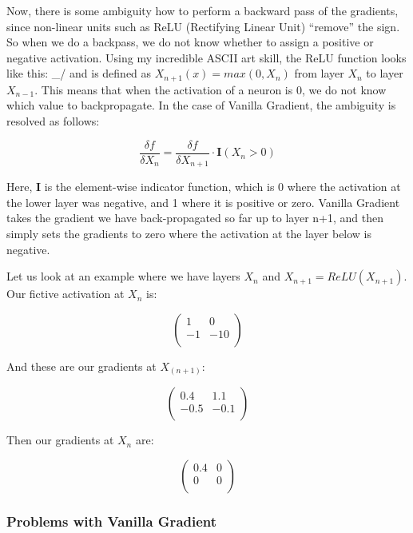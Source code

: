 \documentclass[
  12pt,
]{krantz}
\begin{document}
Now, there is some ambiguity how to perform a backward pass of the gradients, since non-linear units such as ReLU (Rectifying Linear Unit) ``remove'' the sign.
So when we do a backpass, we do not know whether to assign a positive or negative activation.
Using my incredible ASCII art skill, the ReLU function looks like this: \_/ and is defined as \(X_{n+1}(x)=max(0,X_n)\) from layer \(X_n\) to layer \(X_{n-1}\).
This means that when the activation of a neuron is 0, we do not know which value to backpropagate.
In the case of Vanilla Gradient, the ambiguity is resolved as follows:

\[\frac{\delta f}{\delta X_n} = \frac{\delta f}{\delta X_{n+1}} \cdot \mathbf{I}(X_n > 0)\]

Here, \(\mathbf{I}\) is the element-wise indicator function, which is 0 where the activation at the lower layer was negative, and 1 where it is positive or zero.
Vanilla Gradient takes the gradient we have back-propagated so far up to layer n+1, and then simply sets the gradients to zero where the activation at the layer below is negative.

Let us look at an example where we have layers \(X_n\) and \(X_{n+1}=ReLU(X_{n+1})\).
Our fictive activation at \(X_n\) is:

\[
\begin{pmatrix}
1 & 0 \\
-1 & -10 \\
\end{pmatrix}
\]

And these are our gradients at \(X_{(n+1)}\):

\[
\begin{pmatrix}
0.4 & 1.1 \\
-0.5 & -0.1  \\
\end{pmatrix}
\]

Then our gradients at \(X_n\) are:

\[
\begin{pmatrix}
0.4 & 0 \\
 0 & 0  \\
\end{pmatrix}
\]

\hypertarget{problems-with-vanilla-gradient}{%
\subsubsection{Problems with Vanilla Gradient}\label{problems-with-vanilla-gradient}}
\end{document}
